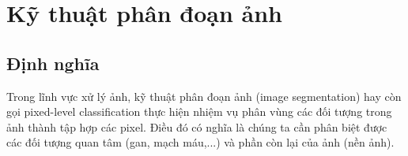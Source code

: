 
\section{Kỹ thuật phân đoạn ảnh}
\subsection{Định nghĩa}
Trong lĩnh vực xử lý ảnh, kỹ thuật phân đoạn ảnh (image segmentation) hay còn gọi pixed-level classification thực hiện nhiệm vụ phân vùng các đối tượng trong ảnh thành tập hợp các pixel. Điều đó có nghĩa là chúng ta cần phân biệt được các đối tượng quan tâm (gan, mạch máu,...) và phần còn lại của ảnh (nền ảnh). \par

